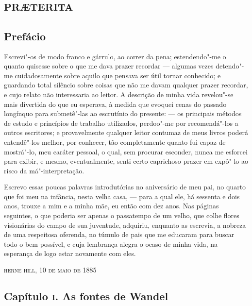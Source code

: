 
\part{\textsc{pr\ae terita}}


\chapter{Prefácio}


Escrevi"-os de modo franco e gárrulo, ao correr da pena; estendendo"-me o
quanto quisesse sobre o que me dava prazer recordar --- algumas vezes
detendo"-me cuidadosamente sobre aquilo que pensava ser útil tornar
conhecido; e guardando total silêncio sobre coisas que não me davam
qualquer prazer recordar, e cujo relato não interessaria ao leitor. A
descrição de minha vida revelou"-se mais divertida do que eu esperava, à
medida que evoquei cenas do passado longínquo para submetê"-las ao
escrutínio do presente: --- os principais métodos de estudo e princípios
de trabalho utilizados, perdoo"-me por recomendá"-los a outros escritores;
e provavelmente qualquer leitor contumaz de meus livros poderá
entendê"-los melhor, por conhecer, tão completamente quanto fui capaz de
mostrá"-lo, meu caráter pessoal, o qual, sem procurar esconder, nunca me
esforcei para exibir, e mesmo, eventualmente, senti certo caprichoso
prazer em expô"-lo ao risco da má"-interpretação.

Escrevo essas poucas palavras introdutórias no aniversário de meu pai,
no quarto que foi meu na infância, nesta velha casa, --- para a qual ele,
há sessenta e dois anos, trouxe a mim e a minha mãe, eu então com dez
anos. Nas páginas seguintes, o que poderia ser apenas o passatempo de um
velho, que colhe flores visionárias do campo de sua juventude, adquiriu,
enquanto as escrevia, a nobreza de uma respeitosa oferenda, no túmulo de
pais que me educaram para buscar todo o bem possível, e cuja lembrança
alegra o ocaso de minha vida, na esperança de logo estar novamente com
eles. \EP[1]


\hfill\textsc{herne hill, 10 de maio de 1885}

\chapter{Capítulo \textsc{i}. As fontes de Wandel}

